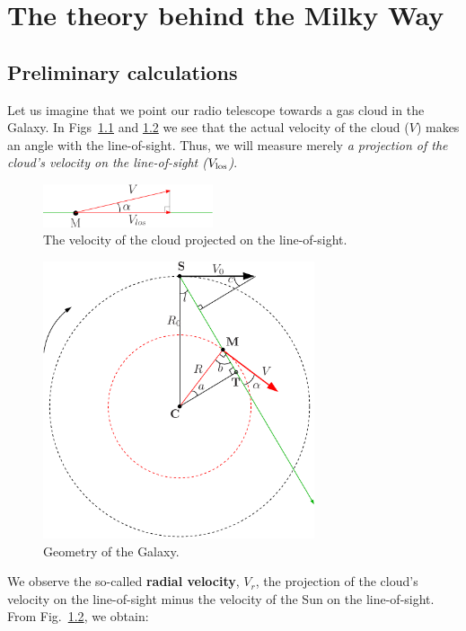 \chapter{The theory behind the Milky Way}

\section{Preliminary calculations}

Let us imagine that we point our radio telescope towards a gas cloud in the Galaxy. 
In Figs~\ref{vproj} and \ref{galgeom} we see that the actual velocity of the cloud
($V$) makes an angle with the line-of-sight. Thus, we will
measure merely {\em a projection of the cloud's velocity on the line-of-sight ($V_{\rm los}$)}. 

\begin{figure}[ht]
\begin{center}
\includegraphics[width=5cm]{../figures/velproj.pdf}
\end{center}
\caption{The velocity of the cloud projected on the line-of-sight.}
\label{vproj}
\end{figure} 

 
\begin{figure}[ht]
\begin{center}
\includegraphics[width=8cm]{../figures/galgeom.pdf}
\end{center}
\caption{Geometry of the Galaxy.}
\label{galgeom}
\end{figure}  

We observe the so-called {\bf radial velocity}, 
$V_r$, the projection of the cloud's velocity on the
line-of-sight minus the velocity of the Sun on the line-of-sight. 
From Fig.~\ref{galgeom}, we obtain: 

